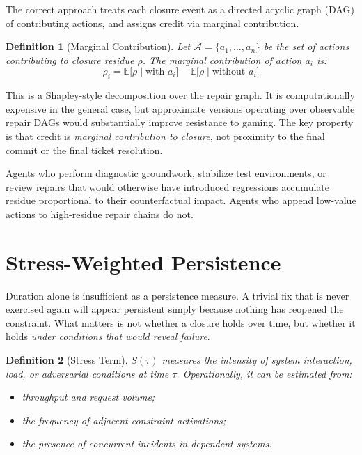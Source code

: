 \documentclass[12pt]{article}
\newtheorem{definition}{Definition}
\begin{document}
The correct approach treats each closure event as a directed acyclic
graph (DAG) of contributing actions, and assigns credit via marginal
contribution.

\begin{definition}[Marginal Contribution]
Let $\mathcal{A} = \{a_1, \ldots, a_n\}$ be the set of actions
contributing to closure residue $\rho$. The marginal contribution of
action $a_i$ is:
\[
  \rho_i =
    \mathbb{E}\bigl[\rho \mid \text{with } a_i\bigr]
    - \mathbb{E}\bigl[\rho \mid \text{without } a_i\bigr]
\]
\end{definition}

This is a Shapley-style decomposition over the repair graph. It is
computationally expensive in the general case, but approximate versions
operating over observable repair DAGs would substantially improve
resistance to gaming. The key property is that credit is \emph{marginal
contribution to closure}, not proximity to the final commit or the final
ticket resolution.

Agents who perform diagnostic groundwork, stabilize test environments,
or review repairs that would otherwise have introduced regressions
accumulate residue proportional to their counterfactual impact.
Agents who append low-value actions to high-residue repair chains do
not.

\section{Stress-Weighted Persistence}

Duration alone is insufficient as a persistence measure. A trivial fix
that is never exercised again will appear persistent simply because
nothing has reopened the constraint. What matters is not whether a
closure holds over time, but whether it holds \emph{under conditions
that would reveal failure}.

\begin{definition}[Stress Term]
$S(\tau)$ measures the intensity of system interaction, load, or
adversarial conditions at time $\tau$. Operationally, it can be
estimated from:
\begin{itemize}
  \item throughput and request volume;
  \item the frequency of adjacent constraint activations;
  \item the presence of concurrent incidents in dependent systems.
\end{itemize}
\end{definition}
\end{document}
